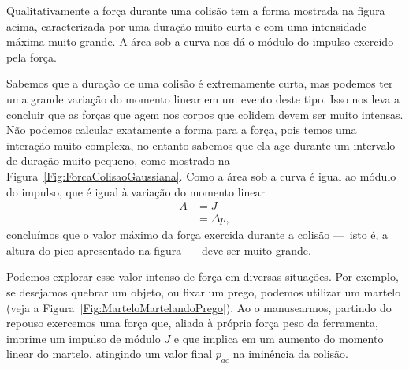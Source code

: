 \begin{marginfigure}
\centering
{}
\caption{Qualitativamente a força durante uma colisão tem a forma mostrada na figura acima, caracterizada por uma duração muito curta e com uma intensidade máxima muito grande. A área sob a curva nos dá o módulo do impulso exercido pela força.\label{Fig:ForcaColisaoGaussiana}}
\end{marginfigure}

Sabemos que a duração de uma colisão é extremamente curta, mas podemos ter uma grande variação do momento linear em um evento deste tipo. Isso nos leva a concluir que as forças que agem nos corpos que colidem devem ser muito intensas. Não podemos calcular exatamente a forma para a força, pois temos uma interação muito complexa, no entanto sabemos que ela age durante um intervalo de duração muito pequeno, como mostrado na Figura~\ref{Fig:ForcaColisaoGaussiana}. Como a área sob a curva é igual ao módulo do impulso, que é igual à variação do momento linear
\begin{align}
    A &= J \\
    &= \Delta p,
\end{align}
%
concluímos que o valor máximo da força exercida durante a colisão ---~isto é, a altura do pico apresentado na figura~--- deve ser muito grande.

Podemos explorar esse valor intenso de força em diversas situações. Por exemplo, se desejamos quebrar um objeto, ou fixar um prego, podemos utilizar um martelo (veja a Figura~\ref{Fig:MarteloMartelandoPrego}). Ao o manusearmos, partindo do repouso exercemos uma força que, aliada à própria força peso da ferramenta, imprime um impulso de módulo $J$ e que implica em um aumento do momento linear do martelo, atingindo um valor final $p_{ac}$ na iminência da colisão.

